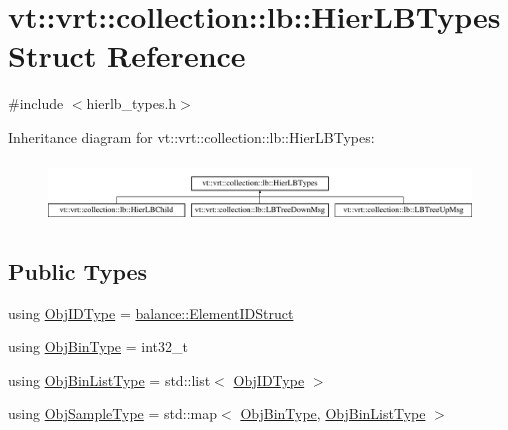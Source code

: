 \hypertarget{structvt_1_1vrt_1_1collection_1_1lb_1_1_hier_l_b_types}{}\section{vt\+:\+:vrt\+:\+:collection\+:\+:lb\+:\+:Hier\+L\+B\+Types Struct Reference}
\label{structvt_1_1vrt_1_1collection_1_1lb_1_1_hier_l_b_types}


{\ttfamily \#include $<$hierlb\+\_\+types.\+h$>$}

Inheritance diagram for vt\+:\+:vrt\+:\+:collection\+:\+:lb\+:\+:Hier\+L\+B\+Types\+:\begin{figure}[H]
\begin{center}
\leavevmode
\includegraphics[height=1.623188cm]{structvt_1_1vrt_1_1collection_1_1lb_1_1_hier_l_b_types}
\end{center}
\end{figure}
\subsection*{Public Types}
\begin{DoxyCompactItemize}
\item 
using \hyperlink{structvt_1_1vrt_1_1collection_1_1lb_1_1_hier_l_b_types_a9f71a6bbdc8603a2c58172521f82c5e2}{Obj\+I\+D\+Type} = \hyperlink{namespacevt_1_1vrt_1_1collection_1_1balance_a9f5b53fafb270212279a4757d2c4cd28}{balance\+::\+Element\+I\+D\+Struct}
\item 
using \hyperlink{structvt_1_1vrt_1_1collection_1_1lb_1_1_hier_l_b_types_a280971a7971a7fc215214e81ba3b12b5}{Obj\+Bin\+Type} = int32\+\_\+t
\item 
using \hyperlink{structvt_1_1vrt_1_1collection_1_1lb_1_1_hier_l_b_types_ac1e6fedb923b2a16f440a61e6dc94173}{Obj\+Bin\+List\+Type} = std\+::list$<$ \hyperlink{structvt_1_1vrt_1_1collection_1_1lb_1_1_hier_l_b_types_a9f71a6bbdc8603a2c58172521f82c5e2}{Obj\+I\+D\+Type} $>$
\item 
using \hyperlink{structvt_1_1vrt_1_1collection_1_1lb_1_1_hier_l_b_types_a597a60d517207b90e8c7984eac434e8f}{Obj\+Sample\+Type} = std\+::map$<$ \hyperlink{structvt_1_1vrt_1_1collection_1_1lb_1_1_hier_l_b_types_a280971a7971a7fc215214e81ba3b12b5}{Obj\+Bin\+Type}, \hyperlink{structvt_1_1vrt_1_1collection_1_1lb_1_1_hier_l_b_types_ac1e6fedb923b2a16f440a61e6dc94173}{Obj\+Bin\+List\+Type} $>$
\end{DoxyCompactItemize}


